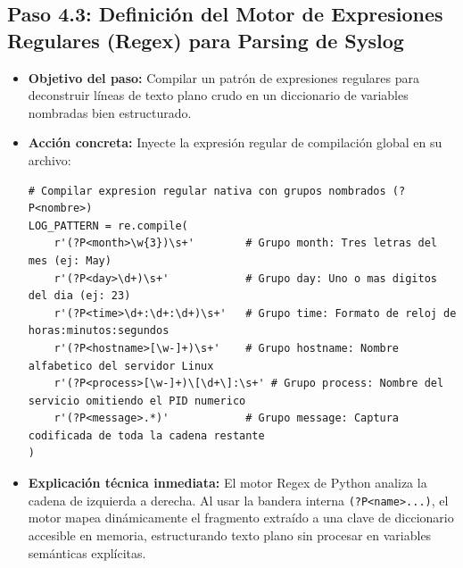 \documentclass[
  coursetitle={Cómputo Nube y Tecnologías Emergentes},
  coursehours={96},
  coursedate={Verano 2026},
  doctype={Práctica},
  otherlangs={english,french},
  authorname={Lázaro},
  authorsurname={Bustio-Martínez},
  authortitle={PhD},
  role={Profesor Investigador},
  email={lbustio@inaoe.mx},
  phone={5559504000},
  ext={7459},
  institution={Instituto Nacional de Astrofísica, Óptica y Electrónica (INAOE)},
  department={Maestría en Ciencias en Tecnologías de Seguridad},
  address={Luis Enrique Erro 1, Sta. Ma. Tonantzintla, San Andrés Cholula, CP 72840, Puebla, México},
  margin={0.5in}
]{../../lbustio_lecture_notes}
\begin{document}
\subsection{Paso 4.3: Definición del Motor de Expresiones Regulares (Regex) para Parsing de Syslog}
\begin{itemize}
    \item \textbf{Objetivo del paso:} Compilar un patrón de expresiones regulares para deconstruir líneas de texto plano crudo en un diccionario de variables nombradas bien estructurado.
    \item \textbf{Acción concreta:} Inyecte la expresión regular de compilación global en su archivo:
\begin{verbatim}
# Compilar expresion regular nativa con grupos nombrados (?P<nombre>)
LOG_PATTERN = re.compile(
    r'(?P<month>\w{3})\s+'        # Grupo month: Tres letras del mes (ej: May)
    r'(?P<day>\d+)\s+'            # Grupo day: Uno o mas digitos del dia (ej: 23)
    r'(?P<time>\d+:\d+:\d+)\s+'   # Grupo time: Formato de reloj de horas:minutos:segundos
    r'(?P<hostname>[\w-]+)\s+'    # Grupo hostname: Nombre alfabetico del servidor Linux
    r'(?P<process>[\w-]+)\[\d+\]:\s+' # Grupo process: Nombre del servicio omitiendo el PID numerico
    r'(?P<message>.*)'            # Grupo message: Captura codificada de toda la cadena restante
)
\end{verbatim}
    \item \textbf{Explicación técnica inmediata:} El motor Regex de Python analiza la cadena de izquierda a derecha. Al usar la bandera interna \texttt{(?P<name>...)}, el motor mapea dinámicamente el fragmento extraído a una clave de diccionario accesible en memoria, estructurando texto plano sin procesar en variables semánticas explícitas.
\end{itemize}
\end{document}
